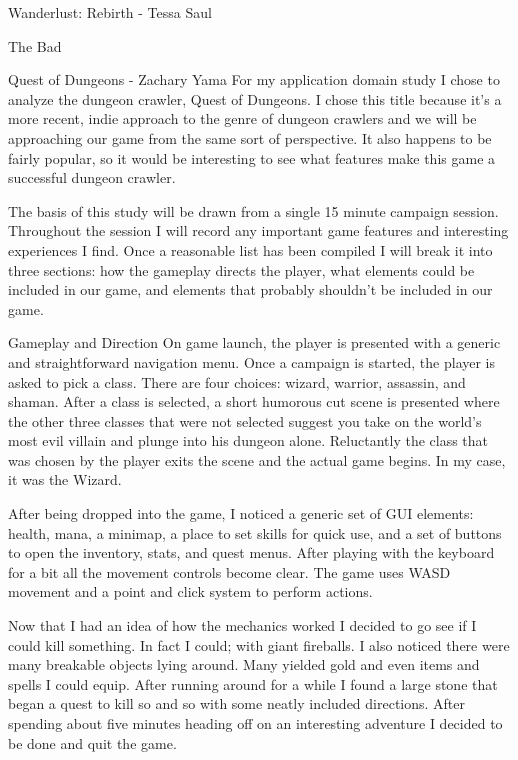 \documentclass[12pt]{report}
\begin{document}
\begin{section}{Wanderlust: Rebirth - Tessa Saul}
\begin{subsection}{The Bad}
\end{subsection}

\begin{section}{Quest of Dungeons - Zachary Yama}
For my application domain study I chose to analyze the dungeon crawler, Quest of Dungeons. 
I chose this title because it’s a more recent, indie approach to the genre of dungeon crawlers 
and we will be approaching our game from the same sort of perspective. It also happens to be 
fairly popular, so it would be interesting to see what features make this game a successful 
dungeon crawler.
 
The basis of this study will be drawn from a single 15 minute campaign session. Throughout the 
session I will record any important game features and interesting experiences I find. Once a 
reasonable list has been compiled I will break it into three sections: how the gameplay directs 
the player, what elements could be included in our game, and elements that probably shouldn’t 
be included in our game.
 
\begin{subsection}{Gameplay and Direction}
On game launch, the player is presented with a generic and straightforward navigation menu. 
Once a campaign is started, the player is asked to pick a class. There are four choices: wizard, 
warrior, assassin, and shaman. After a class is selected, a short humorous cut scene is presented 
where the other three classes that were not selected suggest you take on the world’s most evil 
villain and plunge into his dungeon alone. Reluctantly the class that was chosen by the player 
exits the scene and the actual game begins. In my case, it was the Wizard.
 
After being dropped into the game, I noticed a generic set of GUI elements: health, mana, a 
minimap, a place to set skills for quick use, and a set of buttons to open the inventory, stats, 
and quest menus. After playing with the keyboard for a bit all the movement controls become clear. 
The game uses WASD movement and a point and click system to perform actions.
 
Now that I had an idea of how the mechanics worked I decided to go see if I could kill something. 
In fact I could; with giant fireballs. I also noticed there were many breakable objects lying 
around. Many yielded gold and even items and spells I could equip. After running around for a 
while I found a large stone that began a quest to kill so and so with some neatly included 
directions. After spending about five minutes heading off on an interesting adventure I decided 
to be done and quit the game.
 

\end{subsection}
\end{section}
\end{section}
\end{document}
